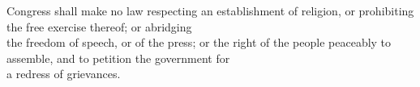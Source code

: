 \documentclass[convert={imagemagick,density=300}]{standalone}
\begin{document}
\parbox[t][72pt][c]{300pt}{
Congress shall make no law respecting an establishment of religion, or
prohibiting the free exercise thereof; or abridging\\ the freedom of
speech, or of the press; or the right of the people peaceably to
assemble, and to petition the government for\\ a redress of grievances.
}
\end{document}
